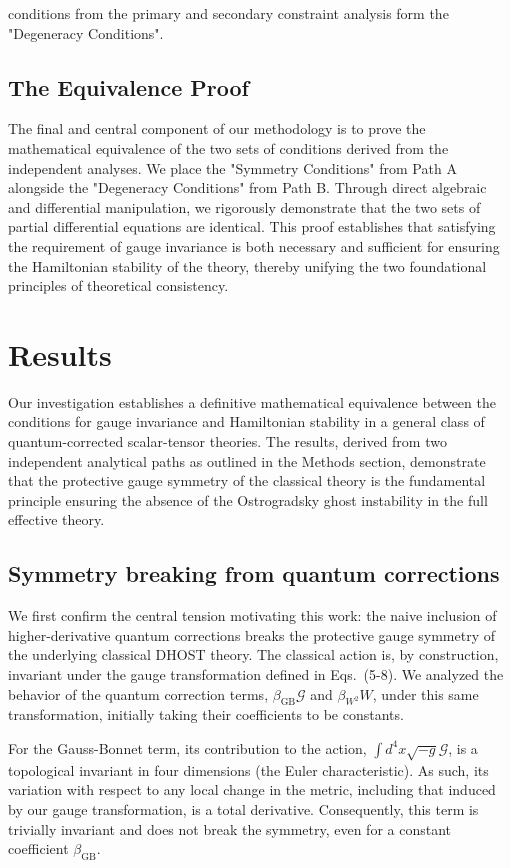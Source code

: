 \documentclass[twocolumn]{aastex631}
\begin{document}
conditions from the primary and secondary constraint analysis form the "Degeneracy Conditions".\subsection{The Equivalence Proof}The final and central component of our methodology is to prove the mathematical equivalence of the two sets of conditions derived from the independent analyses. We place the "Symmetry Conditions" from Path A alongside the "Degeneracy Conditions" from Path B. Through direct algebraic and differential manipulation, we rigorously demonstrate that the two sets of partial differential equations are identical. This proof establishes that satisfying the requirement of gauge invariance is both necessary and sufficient for ensuring the Hamiltonian stability of the theory, thereby unifying the two foundational principles of theoretical consistency.

\section{Results}
\label{sec:results}
Our investigation establishes a definitive mathematical equivalence between the conditions for gauge invariance and Hamiltonian stability in a general class of quantum-corrected scalar-tensor theories. The results, derived from two independent analytical paths as outlined in the Methods section, demonstrate that the protective gauge symmetry of the classical theory is the fundamental principle ensuring the absence of the Ostrogradsky ghost instability in the full effective theory.

\subsection{Symmetry breaking from quantum corrections}

We first confirm the central tension motivating this work: the naive inclusion of higher-derivative quantum corrections breaks the protective gauge symmetry of the underlying classical DHOST theory. The classical action is, by construction, invariant under the gauge transformation defined in Eqs.~(5-8). We analyzed the behavior of the quantum correction terms, $\beta_{\text{GB}}\mathcal{G}$ and $\beta_{W^2}W$, under this same transformation, initially taking their coefficients to be constants.

For the Gauss-Bonnet term, its contribution to the action, $\int d^4x \sqrt{-g} \mathcal{G}$, is a topological invariant in four dimensions (the Euler characteristic). As such, its variation with respect to any local change in the metric, including that induced by our gauge transformation, is a total derivative. Consequently, this term is trivially invariant and does not break the symmetry, even for a constant coefficient $\beta_{\text{GB}}$.
\end{document}
